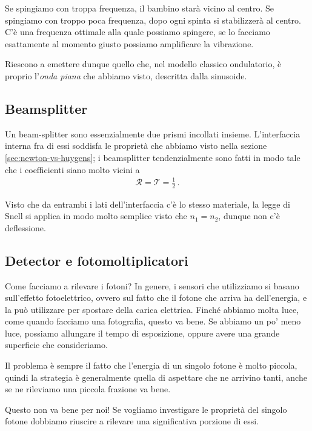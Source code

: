 \documentclass{article}
\begin{document}
Se spingiamo con troppa frequenza, il bambino starà vicino al centro. Se spingiamo con troppo poca frequenza, dopo ogni spinta si stabilizzerà al centro.
C'è una frequenza ottimale alla quale possiamo spingere, se lo facciamo esattamente al momento giusto possiamo amplificare la vibrazione.

Riescono a emettere dunque quello che, nel modello classico ondulatorio, è proprio l'\emph{onda piana} che abbiamo visto, descritta dalla sinusoide.

\subsection{Beamsplitter}

Un beam-splitter sono essenzialmente due prismi incollati insieme.
L'interfaccia interna fra di essi soddisfa le proprietà che abbiamo visto nella sezione \ref{sec:newton-vs-huygens}; i beamsplitter tendenzialmente sono fatti in modo tale che i coefficienti siano molto vicini a 
%
\begin{align}
\mathcal{R} = \mathcal{T} = \frac{1}{2}
\,.
\end{align}

Visto che da entrambi i lati dell'interfaccia c'è lo stesso materiale, la legge di Snell si applica in modo molto semplice visto che \(n_1 = n_2 \), dunque non c'è deflessione.

\subsection{Detector e fotomoltiplicatori}

Come facciamo a rilevare i fotoni? 
In genere, i sensori che utilizziamo si basano sull'effetto fotoelettrico, ovvero sul fatto che il fotone che arriva ha dell'energia, e la può utilizzare per spostare della carica elettrica.
Finché abbiamo molta luce, come quando facciamo una fotografia, questo va bene. Se abbiamo un po' meno luce, possiamo allungare il tempo di esposizione, oppure avere una grande superficie che consideriamo.

Il problema è sempre il fatto che l'energia di un singolo fotone è molto piccola, quindi la strategia è generalmente quella di aspettare che ne arrivino tanti, anche se ne rileviamo una piccola frazione va bene.

Questo non va bene per noi! Se vogliamo investigare le proprietà del singolo fotone dobbiamo riuscire a rilevare una significativa porzione di essi.
\end{document}
